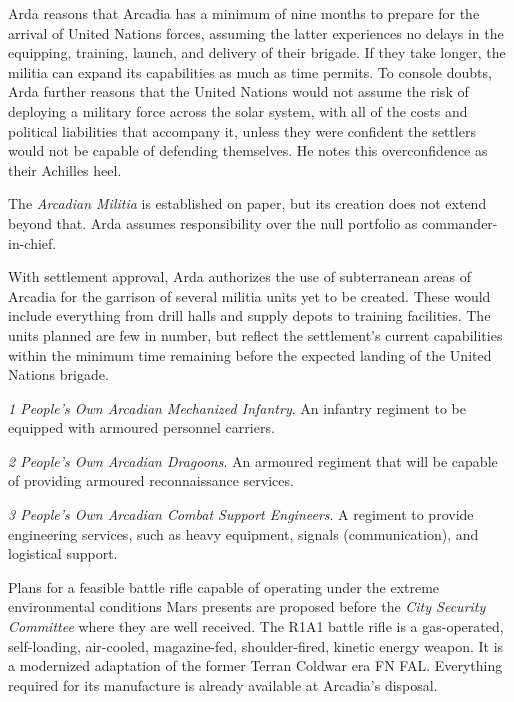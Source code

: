 Arda reasons that Arcadia has a minimum of nine months to prepare for the arrival of United Nations forces, assuming the latter experiences no delays in the equipping, training, launch, and delivery of their brigade. If they take longer, the militia can expand its capabilities as much as time permits. To console doubts, Arda further reasons that the United Nations would not assume the risk of deploying a military force across the solar system, with all of the costs and political liabilities that accompany it, unless they were confident the settlers would not be capable of defending themselves. He notes this overconfidence as their Achilles heel.

The {\it Arcadian Militia} is established on paper, but its creation does not extend beyond that. Arda assumes responsibility over the null portfolio as commander-in-chief.
\StopTimelineDate

With settlement approval, Arda authorizes the use of subterranean areas of Arcadia for the garrison of several militia units yet to be created. These would include everything from drill halls and supply depots to training facilities. The units planned are few in number, but reflect the settlement's current capabilities within the minimum time remaining before the expected landing of the United Nations brigade.

\startitemize[4]
\item {\it 1 People's Own Arcadian Mechanized Infantry}. An infantry regiment to be equipped with armoured personnel carriers.

\item {\it 2 People's Own Arcadian Dragoons}. An armoured regiment that will be capable of providing armoured reconnaissance services.

\item {\it 3 People's Own Arcadian Combat Support Engineers}. A regiment to provide engineering services, such as heavy equipment, signals (communication), and logistical support.
\stopitemize
\StopTimelineDate

Plans for a feasible battle rifle capable of operating under the extreme environmental conditions Mars presents are proposed before the {\it City Security Committee} where they are well received. The R1A1 battle rifle is a gas-operated, self-loading, air-cooled, magazine-fed, shoulder-fired, kinetic energy weapon. It is a modernized adaptation of the former Terran Coldwar era FN FAL. Everything required for its manufacture is already available at Arcadia's disposal.

